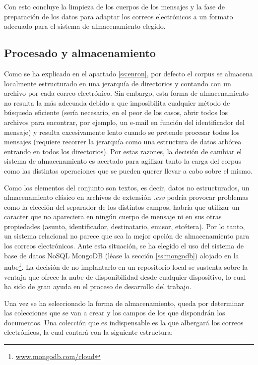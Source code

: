 Con esto concluye la limpieza de los cuerpos de los mensajes y la fase de preparación de los datos para adaptar los correos electrónicos a un formato adecuado para el sistema de almacenamiento elegido.

\subsection{Procesado y almacenamiento}\label{ss:almacen}

Como se ha explicado en el apartado \ref{ss:enron}, por defecto el corpus se almacena localmente estructurado en una jerarquía de directorios y contando con un archivo por cada correo electrónico. Sin embargo, esta forma de almacenamiento no resulta la más adecuada debido a que imposibilita cualquier método de búsqueda eficiente (sería necesario, en el peor de los casos, abrir todos los archivos para encontrar, por ejemplo, un e-mail en función del identificador del mensaje) y resulta excesivamente lento cuando se pretende procesar todos los mensajes (requiere recorrer la jerarquía como una estructura de datos arbórea entrando en todos los directorios). Por estas razones, la decisión de cambiar el sistema de almacenamiento es acertado para agilizar tanto la carga del corpus como las distintas operaciones que se pueden querer llevar a cabo sobre el mismo.

Como los elementos del conjunto son textos, es decir, datos no estructurados, un almacenamiento clásico en archivos de extensión \textit{.csv} podría provocar problemas como la elección del separador de los distintos campos, habría que utilizar un caracter que no apareciera en ningún cuerpo de mensaje ni en sus otras propiedades (asunto, identificador, destinatario, emisor, etcétera). Por lo tanto, un sistema relacional no parece que sea la mejor opción de almacenamiento para los correos electrónicos. Ante esta situación, se ha elegido el uso del sistema de base de datos NoSQL MongoDB (léase la sección \ref{ss:mongodb}) alojado en la nube\footnote{\url{www.mongodb.com/cloud}}. La decisión de no implantarlo en un repositorio local se sustenta sobre la ventaja que ofrece la nube de disponibilidad desde cualquier dispositivo, lo cual ha sido de gran ayuda en el proceso de desarrollo del trabajo.

Una vez se ha seleccionado la forma de almacenamiento, queda por determinar las colecciones que se van a crear y los campos de los que dispondrán los documentos. Una colección que es indispensable es la que albergará los correos electrónicos, la cual contará con la siguiente estructura:

